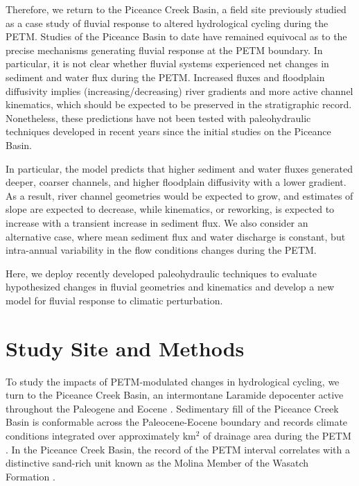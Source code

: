 \documentclass[draft]{compact_proposal}
\newcommand{\del}[3]{\ce{\delta^#1#2_{#3}}}
\begin{document}
Therefore, we return to the Piceance Creek Basin, a field site previously studied as a case study of fluvial response to altered hydrological cycling during the PETM.
Studies of the Piceance Basin to date  have remained equivocal as to the precise mechanisms generating fluvial response at the PETM boundary.
In particular, it is not clear whether fluvial systems experienced net changes in sediment and water flux during the PETM.
Increased fluxes and floodplain diffusivity implies (increasing/decreasing) river gradients and more active channel kinematics, which should be expected to be preserved in the stratigraphic record.
Nonetheless, these predictions have not been tested with paleohydraulic techniques developed in recent years since the initial studies on the Piceance Basin.

In particular, the \cnote[BZF] model predicts that higher sediment and water fluxes generated deeper, coarser channels, and higher floodplain diffusivity with a lower gradient.
As a result, river channel geometries would be expected to grow, and estimates of slope are expected to decrease, while kinematics, or reworking, is expected to increase with a transient increase in sediment flux.
We also consider an alternative case, where mean sediment flux and water discharge is constant, but intra-annual variability in the flow conditions changes during the PETM.

Here, we deploy recently developed paleohydraulic techniques to evaluate hypothesized changes in fluvial geometries and kinematics and develop a new model for fluvial response to climatic perturbation.

\section{Study Site and Methods}


To study the impacts of PETM-modulated changes in hydrological cycling, we turn to the Piceance Creek Basin, an intermontane Laramide depocenter active throughout the Paleogene and Eocene \cnote.
Sedimentary fill of the Piceance Creek Basin is conformable across the Paleocene-Eocene boundary and records climate conditions integrated over approximately  km$^2$ of drainage area during the PETM \cnote.
In the Piceance Creek Basin, the \del{13}{C}{org} record of the PETM interval correlates with a distinctive sand-rich unit known as the Molina Member of the Wasatch Formation \cnote[bzf].
\end{document}
